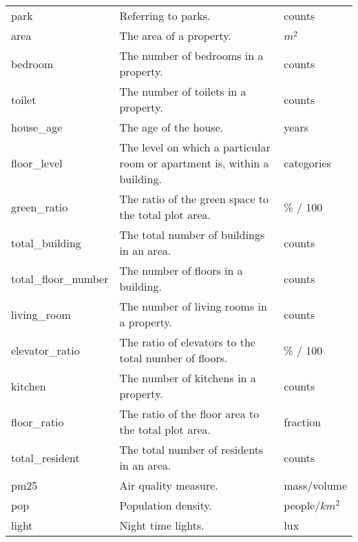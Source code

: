 \begin{tabular}{lll}
park & Referring to parks. & counts \\
area & The area of a property. & $m^2$ \\
bedroom & The number of bedrooms in a property. & counts \\
toilet & The number of toilets in a property. & counts \\
house\_age & The age of the house. & years \\
floor\_level & The level on which a particular room or apartment is, within a building. & categories \\
green\_ratio & The ratio of the green space to the total plot area. & \% / 100 \\
total\_building & The total number of buildings in an area. & counts \\
total\_floor\_number & The number of floors in a building. & counts \\
living\_room & The number of living rooms in a property. & counts \\
elevator\_ratio & The ratio of elevators to the total number of floors. & \% / 100 \\
kitchen & The number of kitchens in a property. & counts \\
floor\_ratio & The ratio of the floor area to the total plot area. & fraction \\
total\_resident & The total number of residents in an area. & counts \\
pm25 & Air quality measure. & mass/volume \\
pop & Population density. & people/$km^2$ \\
light & Night time lights. & lux \\
\bottomrule
\end{tabular}
